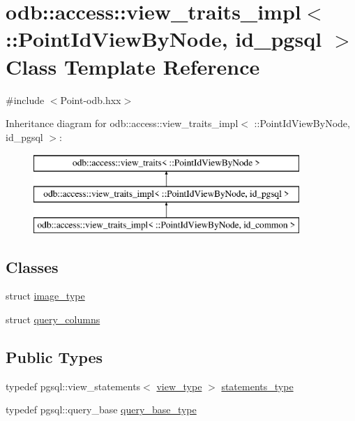 \hypertarget{classodb_1_1access_1_1view__traits__impl_3_01_1_1_point_id_view_by_node_00_01id__pgsql_01_4}{}\section{odb\+:\+:access\+:\+:view\+\_\+traits\+\_\+impl$<$ \+:\+:Point\+Id\+View\+By\+Node, id\+\_\+pgsql $>$ Class Template Reference}
\label{classodb_1_1access_1_1view__traits__impl_3_01_1_1_point_id_view_by_node_00_01id__pgsql_01_4}


{\ttfamily \#include $<$Point-\/odb.\+hxx$>$}

Inheritance diagram for odb\+:\+:access\+:\+:view\+\_\+traits\+\_\+impl$<$ \+:\+:Point\+Id\+View\+By\+Node, id\+\_\+pgsql $>$\+:\begin{figure}[H]
\begin{center}
\leavevmode
\includegraphics[height=3.000000cm]{d6/da2/classodb_1_1access_1_1view__traits__impl_3_01_1_1_point_id_view_by_node_00_01id__pgsql_01_4}
\end{center}
\end{figure}
\subsection*{Classes}
\begin{DoxyCompactItemize}
\item 
struct \hyperlink{structodb_1_1access_1_1view__traits__impl_3_01_1_1_point_id_view_by_node_00_01id__pgsql_01_4_1_1image__type}{image\+\_\+type}
\item 
struct \hyperlink{structodb_1_1access_1_1view__traits__impl_3_01_1_1_point_id_view_by_node_00_01id__pgsql_01_4_1_1query__columns}{query\+\_\+columns}
\end{DoxyCompactItemize}
\subsection*{Public Types}
\begin{DoxyCompactItemize}
\item 
typedef pgsql\+::view\+\_\+statements$<$ \hyperlink{classodb_1_1access_1_1view__traits_3_01_1_1_point_id_view_by_node_01_4_ac97bef0d1fd364108274046727e3da42}{view\+\_\+type} $>$ \hyperlink{classodb_1_1access_1_1view__traits__impl_3_01_1_1_point_id_view_by_node_00_01id__pgsql_01_4_ace8d635e8174d93c66df56bdf5008816}{statements\+\_\+type}
\item 
typedef pgsql\+::query\+\_\+base \hyperlink{classodb_1_1access_1_1view__traits__impl_3_01_1_1_point_id_view_by_node_00_01id__pgsql_01_4_a3e39fad2f5702025ced735c78b6306b1}{query\+\_\+base\+\_\+type}
\end{DoxyCompactItemize}
